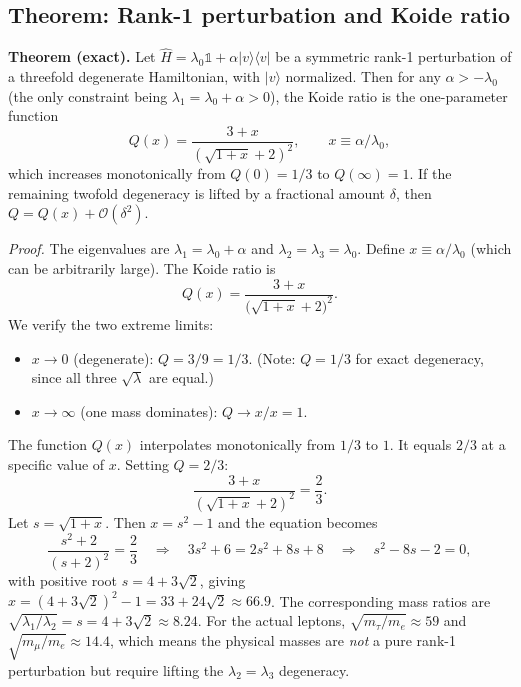 \documentclass[aps,prd,onecolumn,superscriptaddress,nofootinbib,showpacs,12pt,notitlepage]{revtex4-2}
\begin{document}
\subsection{Theorem: Rank-1 perturbation and Koide ratio}
\label{app:theorem_koide}

\textbf{Theorem (exact).}  Let $\hat{H} =
\lambda_{0}\mathbb{1} + \alpha|v\rangle\langle v|$ be a
symmetric rank-1 perturbation of a threefold degenerate
Hamiltonian, with $|v\rangle$ normalized.  Then
for any $\alpha > -\lambda_{0}$ (the only
constraint being $\lambda_{1} = \lambda_{0}+\alpha > 0$),
the Koide ratio is the one-parameter function
\begin{equation}
  Q(x) = \frac{3+x}{(\sqrt{1+x}+2)^2}, \qquad
  x \equiv \alpha/\lambda_0,
\end{equation}
which increases monotonically from $Q(0) = 1/3$ to
$Q(\infty) = 1$.  If the remaining twofold degeneracy is
lifted by a fractional amount $\delta$, then
$Q = Q(x) + \mathcal{O}(\delta^2)$.

\textit{Proof.}  The eigenvalues are
$\lambda_{1} = \lambda_{0}+\alpha$ and
$\lambda_{2} = \lambda_{3} = \lambda_{0}$.
Define $x \equiv \alpha/\lambda_{0}$ (which can be
arbitrarily large).  The Koide ratio is
\begin{equation}\label{eq:Q_exact}
  Q(x) = \frac{3 + x}
    {\bigl(\sqrt{1+x} + 2\bigr)^{2}}.
\end{equation}
We verify the two extreme limits:
\begin{itemize}
  \item $x \to 0$ (degenerate):
    $Q = 3/9 = 1/3$. (Note: $Q = 1/3$ for exact
    degeneracy, since all three $\sqrt{\lambda}$ are
    equal.)
  \item $x \to \infty$ (one mass dominates):
    $Q \to x/x = 1$.
\end{itemize}
The function $Q(x)$ interpolates monotonically from
$1/3$ to $1$.  It equals $2/3$ at a specific value of $x$.
Setting $Q = 2/3$:
\begin{equation}
  \frac{3+x}{(\sqrt{1+x}+2)^{2}} = \frac{2}{3}.
\end{equation}
Let $s = \sqrt{1+x}$.  Then $x = s^{2}-1$ and the
equation becomes
\begin{equation}
  \frac{s^{2}+2}{(s+2)^{2}} = \frac{2}{3}
  \quad\Rightarrow\quad
  3s^{2}+6 = 2s^{2}+8s+8
  \quad\Rightarrow\quad
  s^{2}-8s-2 = 0,
\end{equation}
with positive root $s = 4+3\sqrt{2}$, giving
$x = (4+3\sqrt{2})^{2}-1 = 33+24\sqrt{2} \approx 66.9$.
The corresponding mass ratios are
$\sqrt{\lambda_{1}/\lambda_{2}} = s = 4+3\sqrt{2}
\approx 8.24$.  For the actual leptons,
$\sqrt{m_{\tau}/m_{e}} \approx 59$ and
$\sqrt{m_{\mu}/m_{e}} \approx 14.4$, which means the
physical masses are \emph{not} a pure rank-1 perturbation
but require lifting the $\lambda_{2} = \lambda_{3}$
degeneracy.
\end{document}
